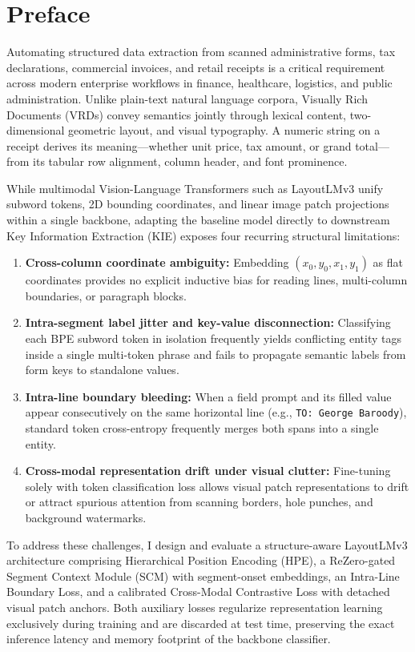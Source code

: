 \chapter*{Preface}

Automating structured data extraction from scanned administrative forms, tax declarations, commercial invoices, and retail receipts is a critical requirement across modern enterprise workflows in finance, healthcare, logistics, and public administration. Unlike plain-text natural language corpora, Visually Rich Documents (VRDs) convey semantics jointly through lexical content, two-dimensional geometric layout, and visual typography. A numeric string on a receipt derives its meaning—whether unit price, tax amount, or grand total—from its tabular row alignment, column header, and font prominence.

While multimodal Vision-Language Transformers such as LayoutLMv3 unify subword tokens, 2D bounding coordinates, and linear image patch projections within a single backbone, adapting the baseline model directly to downstream Key Information Extraction (KIE) exposes four recurring structural limitations:
\begin{enumerate}
    \item \textbf{Cross-column coordinate ambiguity:} Embedding $(x_0, y_0, x_1, y_1)$ as flat coordinates provides no explicit inductive bias for reading lines, multi-column boundaries, or paragraph blocks.
    \item \textbf{Intra-segment label jitter and key-value disconnection:} Classifying each BPE subword token in isolation frequently yields conflicting entity tags inside a single multi-token phrase and fails to propagate semantic labels from form keys to standalone values.
    \item \textbf{Intra-line boundary bleeding:} When a field prompt and its filled value appear consecutively on the same horizontal line (e.g., \texttt{TO: George Baroody}), standard token cross-entropy frequently merges both spans into a single entity.
    \item \textbf{Cross-modal representation drift under visual clutter:} Fine-tuning solely with token classification loss allows visual patch representations to drift or attract spurious attention from scanning borders, hole punches, and background watermarks.
\end{enumerate}

To address these challenges, I design and evaluate a structure-aware LayoutLMv3 architecture comprising Hierarchical Position Encoding (HPE), a ReZero-gated Segment Context Module (SCM) with segment-onset embeddings, an Intra-Line Boundary Loss, and a calibrated Cross-Modal Contrastive Loss with detached visual patch anchors. Both auxiliary losses regularize representation learning exclusively during training and are discarded at test time, preserving the exact inference latency and memory footprint of the backbone classifier.

